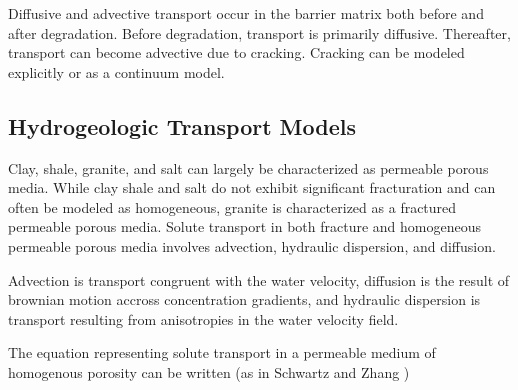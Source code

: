 {Diffusive and advective transport occur in the barrier matrix both before and 
after degradation. Before degradation, transport is primarily diffusive. 
Thereafter, transport can become advective due to cracking. Cracking can be 
modeled explicitly or as a continuum model.  


\subsection{Hydrogeologic Transport Models}
Clay, shale, granite, and salt can largely be characterized as permeable porous 
media. While clay shale and salt do not exhibit significant fracturation and can 
often be modeled as homogeneous, granite is  characterized as a fractured 
permeable porous media.  Solute transport in both fracture and homogeneous 
permeable porous media involves advection, hydraulic dispersion, and diffusion. 

Advection is transport congruent with the water velocity, diffusion is the 
result of brownian motion accross concentration gradients, and hydraulic 
dispersion is transport resulting from anisotropies in the water velocity field. 








The equation representing solute transport in a permeable medium of homogenous
porosity can be written (as in Schwartz and Zhang 
\cite{schwartz_fundamentals_2004})

}

